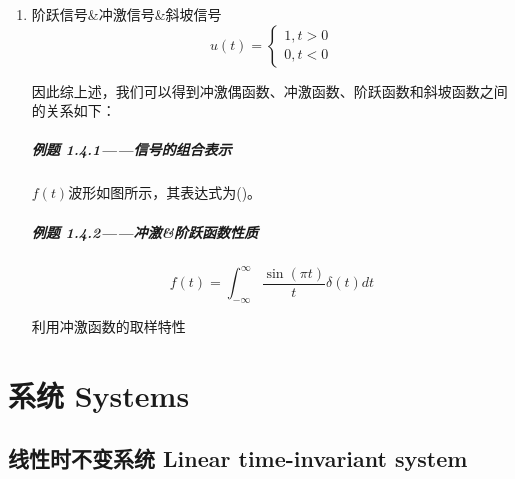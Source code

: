 \documentclass[UTF8]{article}
\begin{document}
\begin{enumerate}
            (3) 2n/ w ，是无理数，任何整数 k 都不能使 N 为正整数，因此，此时的正弦序列不是周期序列。例如， o 1/4, sin ( on ）即不是周期序列。

        \subparagraph{判断正弦组合信号的周期性}
            
            分别求出各信号的周期


    \item 阶跃信号\&冲激信号\&斜坡信号
            \[ u(t) =
            \begin{cases}
                1, t>0\\
                0, t<0
            \end{cases} \]


        因此综上述，我们可以得到冲激偶函数、冲激函数、阶跃函数和斜坡函数之间的关系如下：

        \subparagraph{例题 1.4.1——信号的组合表示}

            $f(t)$波形如图所示，其表达式为()。

        \subparagraph{例题 1.4.2——冲激\&阶跃函数性质}

            $$f(t)=\int_{-\infty }^{\infty }\frac{\sin(\pi t)}{t}\delta(t) dt$$

            利用冲激函数的取样特性
            
            
\end{enumerate}

\section{系统 Systems}

\subsection{线性时不变系统 Linear time-invariant system}
\end{document}

